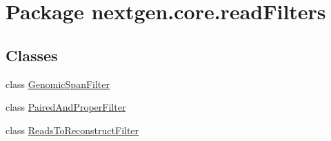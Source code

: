 \hypertarget{namespacenextgen_1_1core_1_1read_filters}{\section{Package nextgen.\+core.\+read\+Filters}
\label{namespacenextgen_1_1core_1_1read_filters}
}
\subsection*{Classes}
\begin{DoxyCompactItemize}
\item 
class \hyperlink{classnextgen_1_1core_1_1read_filters_1_1_genomic_span_filter}{Genomic\+Span\+Filter}
\item 
class \hyperlink{classnextgen_1_1core_1_1read_filters_1_1_paired_and_proper_filter}{Paired\+And\+Proper\+Filter}
\item 
class \hyperlink{classnextgen_1_1core_1_1read_filters_1_1_reads_to_reconstruct_filter}{Reads\+To\+Reconstruct\+Filter}
\end{DoxyCompactItemize}

